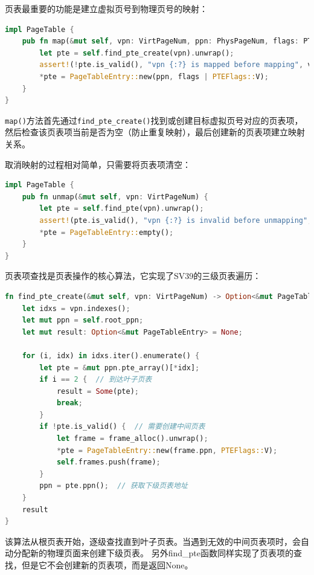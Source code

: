 页表最重要的功能是建立虚拟页号到物理页号的映射：

\begin{lstlisting}[language=Rust,caption={页面映射}, label={lst:page-map}]
impl PageTable {
    pub fn map(&mut self, vpn: VirtPageNum, ppn: PhysPageNum, flags: PTEFlags) {
        let pte = self.find_pte_create(vpn).unwrap();
        assert!(!pte.is_valid(), "vpn {:?} is mapped before mapping", vpn);
        *pte = PageTableEntry::new(ppn, flags | PTEFlags::V);
    }
}
\end{lstlisting}

\lstinline[language=Rust]{map()}方法首先通过\lstinline[language=Rust]{find_pte_create()}找到或创建目标虚拟页号对应的页表项，然后检查该页表项当前是否为空（防止重复映射），最后创建新的页表项建立映射关系。

取消映射的过程相对简单，只需要将页表项清空：

\begin{lstlisting}[language=Rust,caption={取消映射}, label={lst:page-unmap}]
impl PageTable {
    pub fn unmap(&mut self, vpn: VirtPageNum) {
        let pte = self.find_pte(vpn).unwrap();
        assert!(pte.is_valid(), "vpn {:?} is invalid before unmapping", vpn);
        *pte = PageTableEntry::empty();
    }
}
\end{lstlisting}

页表项查找是页表操作的核心算法，它实现了SV39的三级页表遍历：

\begin{lstlisting}[language=Rust,caption={页表项查找}, label={lst:find-pte}]
fn find_pte_create(&mut self, vpn: VirtPageNum) -> Option<&mut PageTableEntry> {
    let idxs = vpn.indexes();
    let mut ppn = self.root_ppn;
    let mut result: Option<&mut PageTableEntry> = None;
    
    for (i, idx) in idxs.iter().enumerate() {
        let pte = &mut ppn.pte_array()[*idx];
        if i == 2 {  // 到达叶子页表
            result = Some(pte);
            break;
        }
        if !pte.is_valid() {  // 需要创建中间页表
            let frame = frame_alloc().unwrap();
            *pte = PageTableEntry::new(frame.ppn, PTEFlags::V);
            self.frames.push(frame);
        }
        ppn = pte.ppn();  // 获取下级页表地址
    }
    result
}
\end{lstlisting}

该算法从根页表开始，逐级查找直到叶子页表。当遇到无效的中间页表项时，会自动分配新的物理页面来创建下级页表。
另外find\_pte函数同样实现了页表项的查找，但是它不会创建新的页表项，而是返回None。

